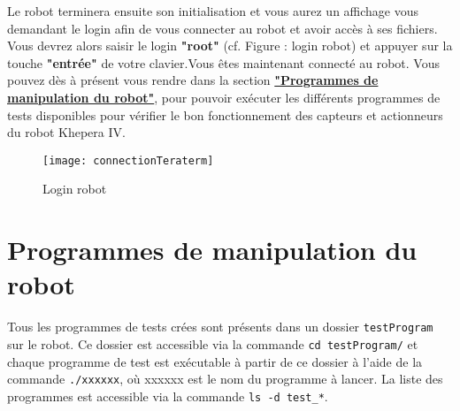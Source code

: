 \documentclass[11pt]{article} %
\begin{document}
Le robot terminera ensuite son initialisation et vous aurez un affichage vous demandant le login afin de vous connecter au robot et avoir accès à ses fichiers. Vous devrez alors saisir le login \textbf{"root"} (cf. Figure : login robot) et appuyer sur la touche \textbf{"entrée"} de votre clavier.Vous êtes maintenant connecté au robot. Vous pouvez dès à présent vous rendre dans la section \hyperref[sec:manip]{\textbf{"Programmes de manipulation du robot"}}, pour pouvoir exécuter les différents programmes de tests disponibles pour vérifier le bon fonctionnement des capteurs et actionneurs du robot Khepera IV.
\begin{figure}[H]
	\caption{Login robot}
	\texttt{[image: connectionTeraterm]}
\end{figure}
\pagebreak
\section{Programmes de manipulation du robot}
\label{sec:manip}
Tous les programmes de tests crées sont présents dans un dossier \verb|testProgram| sur le robot. Ce dossier est accessible via la commande \verb|cd testProgram/| et chaque programme de test est exécutable à partir de ce dossier à l'aide de la commande \verb|./xxxxxx|, où xxxxxx est le nom du programme à lancer. La liste des programmes est accessible via la commande \verb|ls -d test_*|.
\end{document}
